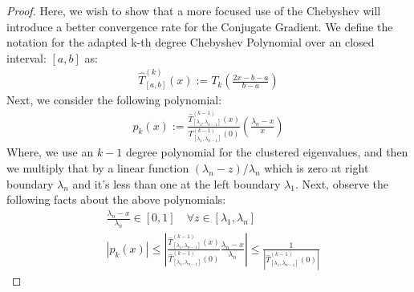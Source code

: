\documentclass[]{article}
\theoremstyle{definition}
\begin{document}
            \begin{proof}
                Here, we wish to show that a more focused use of the Chebyshev will introduce a better convergence rate for the Conjugate Gradient. We define the notation for the adapted k-th degree Chebyshev Polynomial over an closed interval: $[a, b]$ as: 
                \begin{align}
                    \hat{T}_{[a, b]}^{(k)}(x) := 
                    T_k\left(
                        \frac{2x - b - a}{b - a}
                    \right)
                \end{align} 
                Next, we consider the following polynomial: 
                \begin{align}
                    p_k(x) := 
                    \frac
                    {
                        \hat{T}_{[\lambda_1, \lambda_{n - 1}]}^{(k - 1)}
                        \left(
                            x
                        \right)
                    }{
                        T^{(k - 1)}_{[\lambda_1, \lambda_{n - 1}]}
                        \left(
                            0
                        \right)
                    }
                    \left(
                        \frac{\lambda_n - x}{x}
                    \right)
                \end{align}
                Where, we use an $k-1$ degree polynomial for the clustered eigenvalues, and then we multiply that by a linear function $(\lambda_n - z)/\lambda_n$ which is zero at right boundary $\lambda_n$ and it's less than one at the left boundary $\lambda_1$. Next, observe the following facts about the above polynomials: 
                \begin{align}
                    &
                    \frac{\lambda_n - x}{\lambda_n} \in [0, 1]
                    \quad \forall z \in [\lambda_1, \lambda_n]
                    \\
                    & 
                    |p_k(x)| \le
                    \left|
                        \frac{
                            \hat{T}_{[\lambda_1, \lambda_{n-1}]}^{(k - 1)}(x)
                        }{
                            \hat{T}_{[\lambda_1, \lambda_{n - 1}]}^{(k - 1)}(0)
                        }
                        \frac{\lambda_n - x}{\lambda_n}
                    \right|
                    \le 
                    \frac{1}{
                    \left|
                        \hat{T}_{[\lambda_1, \lambda_{n - 1}]}^{(k - 1)}(0)
                    \right|}
                \end{align}

\end{proof}
\end{document}
